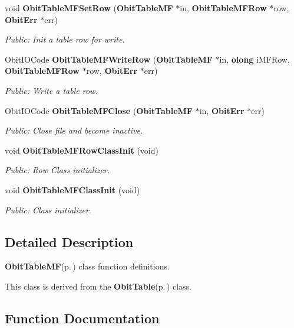 \begin{CompactItemize}
void {\bf Obit\-Table\-MFSet\-Row} ({\bf Obit\-Table\-MF} $\ast$in, {\bf Obit\-Table\-MFRow} $\ast$row, {\bf Obit\-Err} $\ast$err)
\begin{CompactList}\small\item\em Public: Init a table row for write. \item\end{CompactList}\item 
Obit\-IOCode {\bf Obit\-Table\-MFWrite\-Row} ({\bf Obit\-Table\-MF} $\ast$in, {\bf olong} i\-MFRow, {\bf Obit\-Table\-MFRow} $\ast$row, {\bf Obit\-Err} $\ast$err)
\begin{CompactList}\small\item\em Public: Write a table row. \item\end{CompactList}\item 
Obit\-IOCode {\bf Obit\-Table\-MFClose} ({\bf Obit\-Table\-MF} $\ast$in, {\bf Obit\-Err} $\ast$err)
\begin{CompactList}\small\item\em Public: Close file and become inactive. \item\end{CompactList}\item 
void {\bf Obit\-Table\-MFRow\-Class\-Init} (void)
\begin{CompactList}\small\item\em Public: Row Class initializer. \item\end{CompactList}\item 
void {\bf Obit\-Table\-MFClass\-Init} (void)
\begin{CompactList}\small\item\em Public: Class initializer. \item\end{CompactList}\end{CompactItemize}


\subsection{Detailed Description}
{\bf Obit\-Table\-MF}{\rm (p.\,\pageref{structObitTableMF})} class function definitions. 

This class is derived from the {\bf Obit\-Table}{\rm (p.\,\pageref{structObitTable})} class.

\subsection{Function Documentation}
